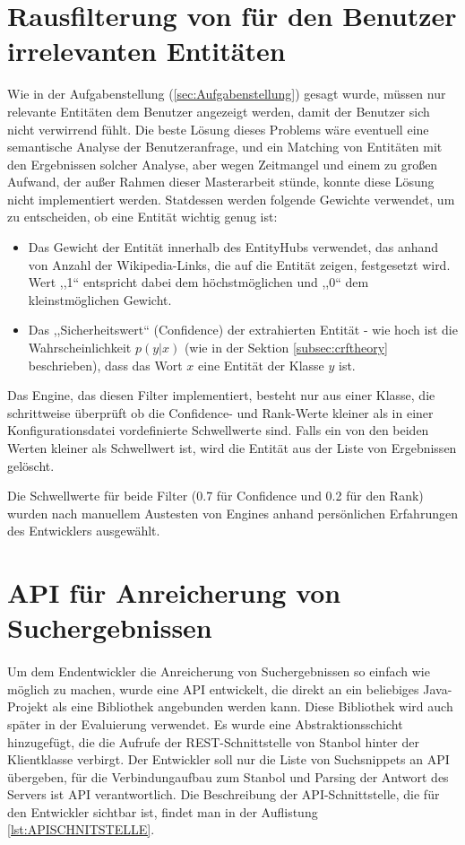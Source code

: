 \section{Rausfilterung von für den Benutzer irrelevanten Entitäten}
Wie in der Aufgabenstellung (\ref{sec:Aufgabenstellung}) gesagt wurde, müssen nur relevante Entitäten dem Benutzer angezeigt werden, damit der Benutzer sich nicht verwirrend fühlt. Die beste Lösung dieses Problems wäre eventuell eine semantische Analyse der Benutzeranfrage, und ein Matching von Entitäten mit den Ergebnissen solcher Analyse, aber wegen Zeitmangel und einem zu großen Aufwand, der außer Rahmen dieser Masterarbeit stünde, konnte diese Lösung nicht implementiert werden. Statdessen werden folgende Gewichte verwendet, um zu entscheiden, ob eine Entität wichtig genug ist:
\begin{itemize}
\item Das Gewicht der Entität innerhalb des EntityHubs verwendet, das anhand von Anzahl der Wikipedia-Links, die auf die Entität zeigen, festgesetzt wird. Wert ,,1`` entspricht dabei dem höchstmöglichen und ,,0`` dem kleinstmöglichen Gewicht.
\item Das ,,Sicherheitswert`` (Confidence) der extrahierten Entität - wie hoch ist die Wahrscheinlichkeit $p(y|x)$ (wie in der Sektion \ref{subsec:crftheory} beschrieben), dass das Wort $x$ eine Entität der Klasse $y$ ist.
\end{itemize}

Das Engine, das diesen Filter implementiert, besteht nur aus einer Klasse, die schrittweise überprüft ob die Confidence- und Rank-Werte kleiner als in einer Konfigurationsdatei vordefinierte Schwellwerte sind. Falls ein von den beiden Werten kleiner als Schwellwert ist, wird die Entität aus der Liste von Ergebnissen gelöscht.

Die Schwellwerte für beide Filter (0.7 für Confidence und 0.2 für den Rank) wurden nach manuellem Austesten von Engines anhand persönlichen Erfahrungen des Entwicklers ausgewählt.

\section{API f{\"{u}}r Anreicherung von Suchergebnissen}
\paragraph{}
Um dem Endentwickler die Anreicherung von Suchergebnissen so einfach wie möglich zu machen, wurde eine API entwickelt, die direkt an ein beliebiges Java-Projekt als eine Bibliothek angebunden werden kann. Diese Bibliothek wird auch später in der Evaluierung verwendet. Es wurde eine Abstraktionsschicht hinzugefügt, die die Aufrufe der REST-Schnittstelle von Stanbol hinter der Klientklasse verbirgt. Der Entwickler soll nur die Liste von Suchsnippets an API übergeben, für die Verbindungaufbau zum Stanbol und Parsing der Antwort des Servers ist API verantwortlich. Die Beschreibung der API-Schnittstelle, die für den Entwickler sichtbar ist, findet man in der Auflistung \ref{lst:APISCHNITSTELLE}. 

